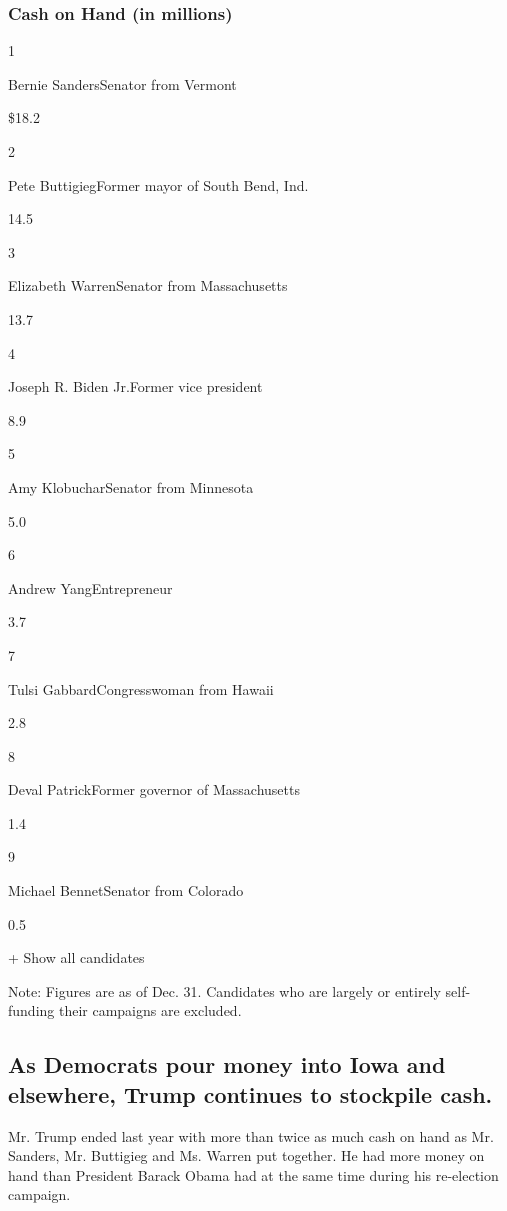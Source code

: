 \hypertarget{cash-on-hand-in-millions}{%
\subsubsection{Cash on Hand (in
millions)}\label{cash-on-hand-in-millions}}

1

Bernie SandersSenator from Vermont

\$18.2

2

Pete ButtigiegFormer mayor of South Bend, Ind.

14.5

3

Elizabeth WarrenSenator from Massachusetts

13.7

4

Joseph R. Biden Jr.Former vice president

8.9

5

Amy KlobucharSenator from Minnesota

5.0

6

Andrew YangEntrepreneur

3.7

7

Tulsi GabbardCongresswoman from Hawaii

2.8

8

Deval PatrickFormer governor of Massachusetts

1.4

9

Michael BennetSenator from Colorado

0.5

+ Show all candidates

Note: Figures are as of Dec. 31. Candidates who are largely or entirely
self-funding their campaigns are excluded.

\hypertarget{as-democrats-pour-money-into-iowa-and-elsewhere-trump-continues-to-stockpile-cash}{%
\subsection{As Democrats pour money into Iowa and elsewhere, Trump
continues to stockpile
cash.}\label{as-democrats-pour-money-into-iowa-and-elsewhere-trump-continues-to-stockpile-cash}}

Mr. Trump ended last year with more than twice as much cash on hand as
Mr. Sanders, Mr. Buttigieg and Ms. Warren put together. He had more
money on hand than President Barack Obama had at the same time during
his re-election campaign.

